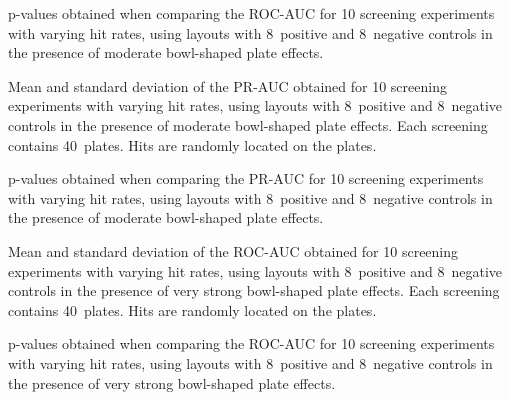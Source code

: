 \begin{table}[p]
    \centering
    \small
    
    \caption{p-values obtained when comparing the ROC-AUC for 10 screening experiments with varying hit rates, using layouts with 8~positive and 8~negative controls in the presence of moderate bowl-shaped plate effects.}
    \label{tab:screening-roc_pvalues-8-8-0.1}
\end{table}

\begin{table}[p]
    \centering
    \small
    
    \caption{Mean and standard deviation of the PR-AUC obtained for 10 screening experiments with varying hit rates, using layouts with 8~positive and 8~negative controls in the presence of moderate bowl-shaped plate effects. Each screening contains 40~plates. Hits are randomly located on the plates.}
    \label{tab:screening-pr_8-8-0.1}
\end{table}

\begin{table}[p]
    \centering
    \small
    
    \caption{p-values obtained when comparing the PR-AUC for 10 screening experiments with varying hit rates, using layouts with 8~positive and 8~negative controls in the presence of moderate bowl-shaped plate effects.}
    \label{tab:screening-pr_pvalues-8-8-0.1}
\end{table}

\clearpage
\begin{table}[p]
    \centering
    \small
    
    \caption{Mean and standard deviation of the ROC-AUC obtained for 10 screening experiments with varying hit rates, using layouts with 8~positive and 8~negative controls in the presence of very strong bowl-shaped plate effects. Each screening contains 40~plates. Hits are randomly located on the plates.}
    \label{tab:screening-roc_8-8-0.2}
\end{table}

\begin{table}[p]
    \centering
    \small
    
    \caption{p-values obtained when comparing the ROC-AUC for 10 screening experiments with varying hit rates, using layouts with 8~positive and 8~negative controls in the presence of very strong bowl-shaped plate effects.}
    \label{tab:screening-roc_pvalues-8-8-0.2}
\end{table}

